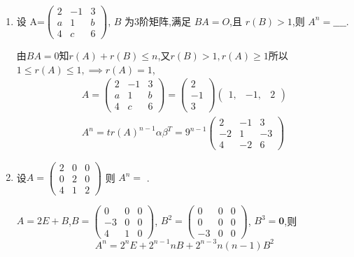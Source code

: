\documentclass[12pt, a4paper, oneside, UTF8]{ctexbook}
\begin{document}
\begin{enumerate}
    \item 设 A=$\left(\begin{array}{rrr}
        2&-1&3\\
        a&1&b\\
        4&c&6
    \end{array}\right)$,
        $ B $ 为3阶矩阵,满足 $ BA = O $,且 $ r(B) > 1 $,则 $ A^n =\_\_\_\_$.
    \begin{solution}
    由$BA=0$知$r(A)+r(B)\leq n$,又$r(B)>1,r(A)\geq 1$所以$1\leq r(A)\leq 1,\implies r(A)=1$,
    \begin{align*}
        A=\left(\begin{array}{rrr}
        2&-1&3\\
        a&1&b\\
        4&c&6
    \end{array}\right)=\begin{pmatrix}
        2\\
        -1\\
        3
    \end{pmatrix}\begin{pmatrix}
        1,&-1,&2
    \end{pmatrix} \\
    A^n=tr(A)^{n-1}\alpha\beta^{T}=9^{n-1}\begin{pmatrix}
        2& -1& 3\\
        -2& 1& -3\\
        4& -2& 6
    \end{pmatrix}
    \end{align*}
    \end{solution}
    \item 设$
    A = \begin{pmatrix}
    2 & 0 & 0 \\
    0 & 2 & 0 \\
    4 & 1&  2
    \end{pmatrix}$
    则 $ A^n = $ \underline{\hspace{3cm}}.
    
    \begin{solution}
    $A=2E+B$,$B=\begin{pmatrix}
        0& 0& 0\\
        -3& 0& 0\\
        4& 1& 0
    \end{pmatrix}$, $B^2=\begin{pmatrix}
        0& 0& 0\\
        0& 0& 0\\
        -3& 0& 0
    \end{pmatrix}$, $B^3=\mathbf{0}$,则
    \[
    A^n=2^nE+2^{n-1}nB+2^{n-3}n(n-1)B^2
    \]
    \end{solution}
    

\end{enumerate}
\end{document}
